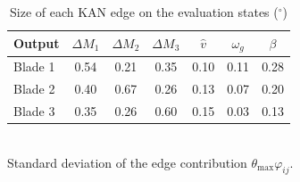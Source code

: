\begin{table}[!t]
\centering
\caption{Size of each KAN edge on the evaluation states ($^\circ$)}
\label{tab:edges}
\renewcommand{\arraystretch}{1.15}
\begin{tabular}{lcccccc}
\hline\hline
Output & $\Delta M_1$ & $\Delta M_2$ & $\Delta M_3$ & $\hat v$ & $\omega_g$ & $\beta$ \\
\hline
Blade 1 & 0.54 & 0.21 & 0.35 & 0.10 & 0.11 & 0.28 \\
Blade 2 & 0.40 & 0.67 & 0.26 & 0.13 & 0.07 & 0.20 \\
Blade 3 & 0.35 & 0.26 & 0.60 & 0.15 & 0.03 & 0.13 \\
\hline\hline
\end{tabular}
\\[2pt]\footnotesize Standard deviation of the edge contribution $\theta_{\max}\varphi_{ij}$.
\end{table}
